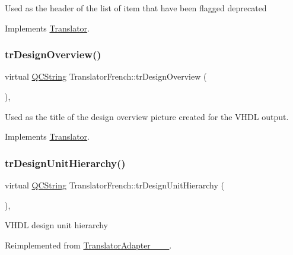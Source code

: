 Used as the header of the list of item that have been flagged deprecated 

Implements \mbox{\hyperlink{class_translator}{Translator}}.

\mbox{\label{class_translator_french_a8ad2984680cd37157210aed25cc996b6}} 
\subsubsection{\texorpdfstring{trDesignOverview()}{trDesignOverview()}}
{\footnotesize\ttfamily virtual \mbox{\hyperlink{class_q_c_string}{Q\+C\+String}} Translator\+French\+::tr\+Design\+Overview (\begin{DoxyParamCaption}{ }\end{DoxyParamCaption})\hspace{0.3cm}{\ttfamily [inline]}, {\ttfamily [virtual]}}

Used as the title of the design overview picture created for the V\+H\+DL output. 

Implements \mbox{\hyperlink{class_translator}{Translator}}.

\mbox{\label{class_translator_french_a2799be4d88e271225a220615ee79f5c0}} 
\subsubsection{\texorpdfstring{trDesignUnitHierarchy()}{trDesignUnitHierarchy()}}
{\footnotesize\ttfamily virtual \mbox{\hyperlink{class_q_c_string}{Q\+C\+String}} Translator\+French\+::tr\+Design\+Unit\+Hierarchy (\begin{DoxyParamCaption}{ }\end{DoxyParamCaption})\hspace{0.3cm}{\ttfamily [inline]}, {\ttfamily [virtual]}}

V\+H\+DL design unit hierarchy 

Reimplemented from \mbox{\hyperlink{class_translator_adapter__1__8__15}{Translator\+Adapter\+\_\+\_\+\_}}.

\mbox{\label{class_translator_french_a2b324ca71516ec4313295fcc37d74ba8}} 
